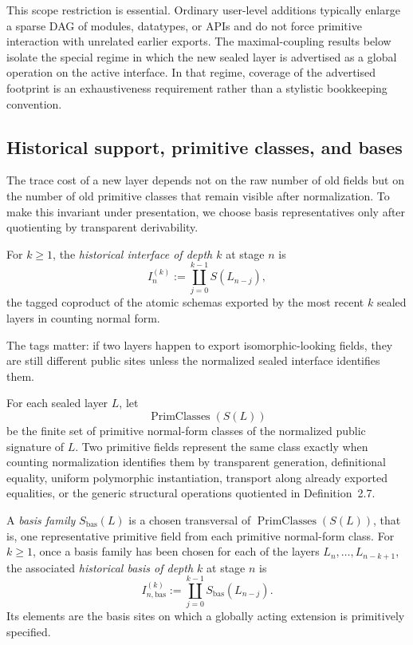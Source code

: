 \documentclass{lmcs}
\begin{document}
This scope restriction is essential.  Ordinary user-level additions typically enlarge a sparse
DAG of modules, datatypes, or APIs and do not force primitive interaction with unrelated
earlier exports.  The maximal-coupling results below isolate the special regime in which the
new sealed layer is advertised as a global operation on the active interface.  In that regime,
coverage of the advertised footprint is an exhaustiveness requirement rather than a stylistic
bookkeeping convention.

\subsection{Historical support, primitive classes, and bases}

The trace cost of a new layer depends not on the raw number of old fields but on the number
of old primitive classes that remain visible after normalization.  To make this invariant under
presentation, we choose basis representatives only after quotienting by transparent
derivability.

\begin{defi}
For \(k\geq 1\), the \emph{historical interface of depth \(k\)} at stage \(n\) is
\[
  I_n^{(k)} := \coprod_{j=0}^{k-1} S(L_{n-j}),
\]
the tagged coproduct of the atomic schemas exported by the most recent \(k\) sealed layers
in counting normal form.
\end{defi}

The tags matter: if two layers happen to export isomorphic-looking fields, they are still
different public sites unless the normalized sealed interface identifies them.

\begin{defi}
For each sealed layer \(L\), let
\[
  \operatorname{PrimClasses}(S(L))
\]
be the finite set of primitive normal-form classes of the normalized public signature of
\(L\).  Two primitive fields represent the same class exactly when counting normalization
identifies them by transparent generation, definitional equality, uniform polymorphic
instantiation, transport along already exported equalities, or the generic structural
operations quotiented in Definition~2.7.

A \emph{basis family} \(S_{\mathrm{bas}}(L)\) is a chosen transversal of
\(\operatorname{PrimClasses}(S(L))\), that is, one representative primitive field from each
primitive normal-form class.  For \(k\geq 1\), once a basis family has been chosen for each of
the layers \(L_n,\ldots,L_{n-k+1}\), the associated \emph{historical basis of depth \(k\)} at
stage \(n\) is
\[
  I_{n,\mathrm{bas}}^{(k)} := \coprod_{j=0}^{k-1} S_{\mathrm{bas}}(L_{n-j}).
\]
Its elements are the basis sites on which a globally acting extension is primitively specified.
\end{defi}
\end{document}
